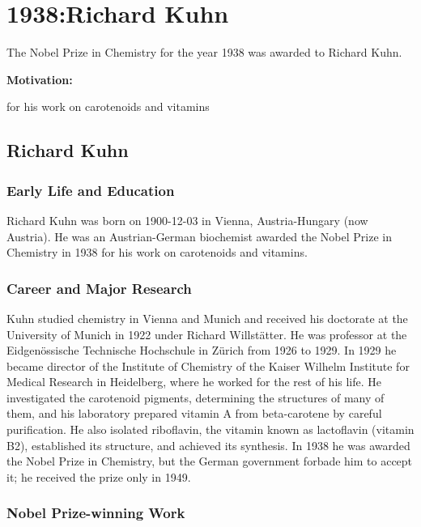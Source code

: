 \chapter{1938:Richard Kuhn}

\label{chap:chemistry1938}

The Nobel Prize in Chemistry for the year 1938 was awarded to Richard Kuhn.

\textbf{Motivation:}

for his work on carotenoids and vitamins

\section{Richard Kuhn}

\subsection*{Early Life and Education}

Richard Kuhn was born on 1900-12-03 in Vienna, Austria-Hungary (now Austria).
He was an Austrian-German biochemist awarded the Nobel Prize in Chemistry in 1938 for his work on carotenoids and vitamins.

\subsection*{Career and Major Research}

Kuhn studied chemistry in Vienna and Munich and received his doctorate at the University of Munich in 1922 under Richard Willstätter.
He was professor at the Eidgenössische Technische Hochschule in Zürich from 1926 to 1929.
In 1929 he became director of the Institute of Chemistry of the Kaiser Wilhelm Institute for Medical Research in Heidelberg, where he worked for the rest of his life.
He investigated the carotenoid pigments, determining the structures of many of them, and his laboratory prepared vitamin A from beta-carotene by careful purification.
He also isolated riboflavin, the vitamin known as lactoflavin (vitamin B2), established its structure, and achieved its synthesis.
In 1938 he was awarded the Nobel Prize in Chemistry, but the German government forbade him to accept it; he received the prize only in 1949.

\subsection*{Nobel Prize-winning Work}

